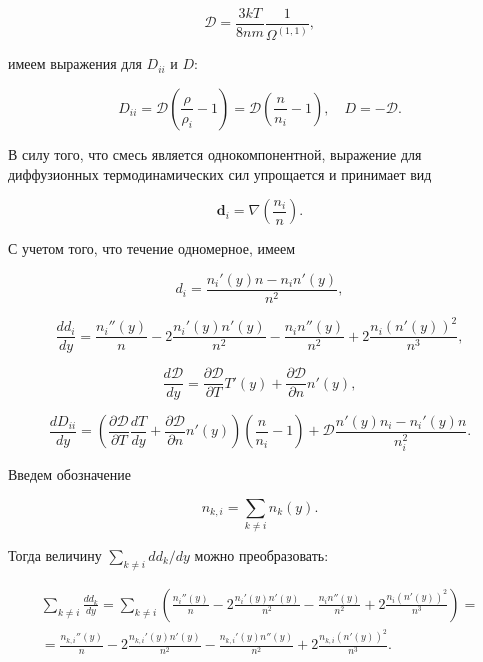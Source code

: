 \documentclass[12pt]{article}
\begin{document}
\begin{equation}
  \mathcal{D} = \frac{3kT}{8nm}\frac{1}{\Omega^{(1,1)}},
\end{equation}

имеем выражения для $D_{ii}$ и $D$:

\begin{equation}
  D_{ii} = \mathcal{D} \left(\frac{\rho}{\rho_{i}} - 1 \right)=\mathcal{D} \left(\frac{n}{n_{i}} - 1 \right),\quad D = -\mathcal{D}.
\end{equation}

В силу того, что смесь является однокомпонентной, выражение для диффузионных термодинамических сил упрощается и принимает вид

\begin{equation}
  \mathbf{d}_{i} = \nabla \left(\frac{n_{i}}{n} \right).
\end{equation}

С учетом того, что течение одномерное, имеем

\begin{equation}
  d_{i} = \frac{n_{i}'(y)n - n_{i}n'(y)}{n^2},
\end{equation}

\begin{equation}
  \frac{d d_{i}}{d y} = \frac{n_{i}''(y)}{n} - 2\frac{n_{i}'(y)n'(y)}{n^2} - \frac{n_{i}n''(y)}{n^2} + 2\frac{n_{i}\left(n'(y) \right)^2}{n^3},
\end{equation}

\begin{equation}
  \frac{d\mathcal{D}}{dy} = \frac{\partial \mathcal{D}}{\partial T} T'(y) + \frac{\partial \mathcal{D}}{\partial n} n'(y),
\end{equation}

\begin{equation}
  \frac{d D_{ii}}{dy} = \left(\frac{\partial \mathcal{D}}{\partial T} \frac{d T}{d y} + \frac{\partial \mathcal{D}}{\partial n} n'(y) \right)
  \left(\frac{n}{n_{i}} - 1 \right) + \mathcal{D} \frac{n'(y)n_{i} - n_{i}'(y)n}{n_{i}^2}.
\end{equation}

Введем обозначение

\begin{equation}
  n_{k,i} = \sum_{k \neq i} n_{k}(y).
\end{equation}

Тогда величину $\sum_{k \neq i} d d_{k} / dy$ можно преобразовать:

\begin{multline}
  \sum_{k \neq i} \frac{d d_{k}}{d y} = \sum_{k \neq i} \left(\frac{n_{i}''(y)}{n} - 2\frac{n_{i}'(y)n'(y)}{n^2} - \frac{n_{i}n''(y)}{n^2} + 2\frac{n_{i}\left(n'(y) \right)^2}{n^3}\right) = \\
  = \frac{n_{k,i}''(y)}{n} - 2\frac{n_{k,i}'(y)n'(y)}{n^2} - \frac{n_{k,i}'(y) n''(y)}{n^2} + 2\frac{n_{k,i}\left(n'(y) \right)^2}{n^3}.
\end{multline}
\end{document}
